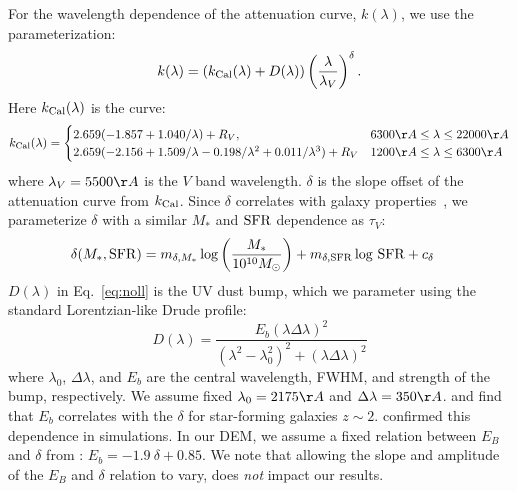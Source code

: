 For the wavelength dependence of the attenuation curve, $k(\lambda)$, we
use the \cite{noll2009} parameterization: 
\begin{equation} \label{eq:noll}
    k(\lambda) = \left(k_{\rm Cal}(\lambda) + D(\lambda)\right) \left(
    \frac{\lambda}{\lambda_V} \right)^\delta.
\end{equation}
Here $k_{\rm Cal}(\lambda)$ is the \cite{calzetti2001} curve: 
\[
    k_{\rm Cal}(\lambda) = 
    \begin{cases} 
        2.659 (-1.857 + 1.040/\lambda) + R_V, & 6300 \AA \le \lambda \le
        22000 \AA \\ 
        2.659 (-2.156 + 1.509/\lambda - 0.198/\lambda^2 + 0.011/\lambda^3) +
        R_V & 1200 \AA \le \lambda \le 6300 \AA
    \end{cases}
\]
where $\lambda_V = 5500 \AA$ is the $V$ band wavelength. $\delta$ is the slope
offset of the attenuation curve from $k_{\rm Cal}$. Since $\delta$ correlates 
with galaxy properties~\citep[\eg][]{leja2017, salim2018},
we parameterize $\delta$ with a similar $M_*$ and ${\rm SFR}$ dependence as
$\tau_V$:  
\begin{align} \label{eq:delta}
    \delta(M_*, {\rm SFR}) &= m_{\delta,M_*} \log \left(\frac{M_*}{10^{10}
    M_\odot}\right) + m_{\delta,{\rm SFR}} \log\,{\rm SFR} + c_\delta 
\end{align}
$D(\lambda)$ in Eq.~\ref{eq:noll} is the UV dust bump, which we parameter using
the standard Lorentzian-like Drude profile:
\begin{equation}
    D(\lambda) = \frac{E_b(\lambda \Delta \lambda)^2}{(\lambda^2 -
    \lambda_0^2)^2 + (\lambda \Delta \lambda)^2}
\end{equation}
where $\lambda_0$, $\Delta \lambda$, and $E_b$ are the central wavelength,
FWHM, and strength of the bump, respectively. We assume fixed $\lambda_0 = 2175
\AA$ and $\Delta \lambda = 350\AA$. \cite{kriek2013} and \cite{tress2018} find
that $E_b$ correlates with the $\delta$ for star-forming galaxies $z\sim2$.
\cite{narayanan2018} confirmed this dependence in simulations. In our DEM, we
assume a fixed relation between $E_B$ and $\delta$ from \cite{kriek2013}: 
$E_b = -1.9~\delta + 0.85$. We note that allowing the slope and amplitude 
of the $E_B$ and $\delta$ relation to vary, does {\em not} impact our results.

